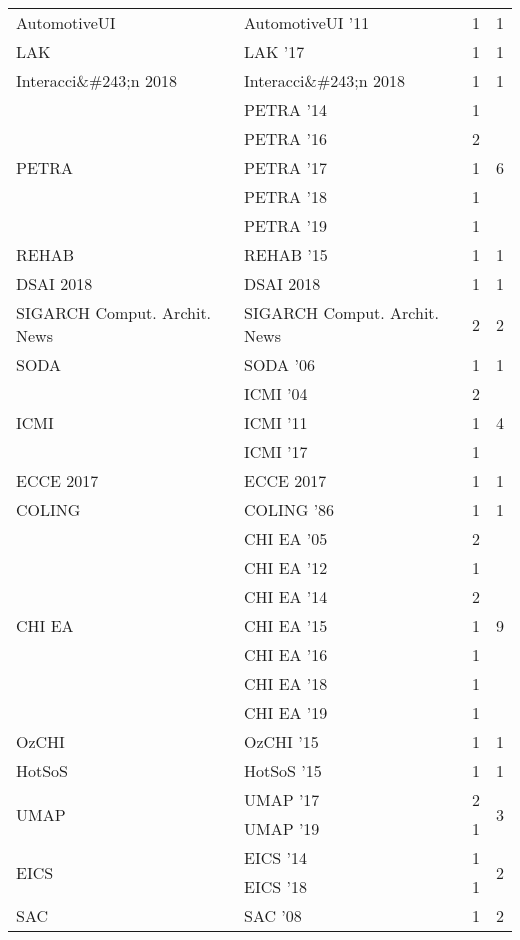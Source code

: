 \begin{table*}[t]
\begin{tabular}{llrr}
\multirow{1}{*}{AutomotiveUI } & AutomotiveUI '11 & 1 & \multirow{1}{*}{1}\\
\multirow{1}{*}{LAK } & LAK '17 & 1 & \multirow{1}{*}{1}\\
\multirow{1}{*}{Interacci\&\#243;n 2018} & Interacci\&\#243;n 2018 & 1 & \multirow{1}{*}{1}\\
\multirow{5}{*}{PETRA } & PETRA '14 & 1 & \multirow{5}{*}{6}\\
& PETRA '16 & 2 &\\
& PETRA '17 & 1 &\\
& PETRA '18 & 1 &\\
& PETRA '19 & 1 &\\
\multirow{1}{*}{REHAB } & REHAB '15 & 1 & \multirow{1}{*}{1}\\
\multirow{1}{*}{DSAI 2018} & DSAI 2018 & 1 & \multirow{1}{*}{1}\\
\multirow{1}{*}{SIGARCH Comput. Archit. News} & SIGARCH Comput. Archit. News & 2 & \multirow{1}{*}{2}\\
\multirow{1}{*}{SODA } & SODA '06 & 1 & \multirow{1}{*}{1}\\
\multirow{3}{*}{ICMI } & ICMI '04 & 2 & \multirow{3}{*}{4}\\
& ICMI '11 & 1 &\\
& ICMI '17 & 1 &\\
\multirow{1}{*}{ECCE 2017} & ECCE 2017 & 1 & \multirow{1}{*}{1}\\
\multirow{1}{*}{COLING } & COLING '86 & 1 & \multirow{1}{*}{1}\\
\multirow{7}{*}{CHI EA } & CHI EA '05 & 2 & \multirow{7}{*}{9}\\
& CHI EA '12 & 1 &\\
& CHI EA '14 & 2 &\\
& CHI EA '15 & 1 &\\
& CHI EA '16 & 1 &\\
& CHI EA '18 & 1 &\\
& CHI EA '19 & 1 &\\
\multirow{1}{*}{OzCHI } & OzCHI '15 & 1 & \multirow{1}{*}{1}\\
\multirow{1}{*}{HotSoS } & HotSoS '15 & 1 & \multirow{1}{*}{1}\\
\multirow{2}{*}{UMAP } & UMAP '17 & 2 & \multirow{2}{*}{3}\\
& UMAP '19 & 1 &\\
\multirow{2}{*}{EICS } & EICS '14 & 1 & \multirow{2}{*}{2}\\
& EICS '18 & 1 &\\
\multirow{2}{*}{SAC } & SAC '08 & 1 & \multirow{2}{*}{2}\\

\end{tabular}
\end{table*}
